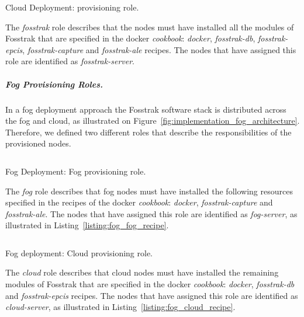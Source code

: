 \begin{listing}[ht!]
\inputminted[frame=lines,
             framesep=3mm,
             linenos=true,
             xleftmargin=21pt,
             tabsize=4]{json}{./listings/fosstrak_role.json}
\caption{Cloud Deployment: provisioning role.}
\label{listing:cloud_recipe}
\end{listing}

The \textit{fosstrak} role describes that the nodes must have installed all the modules of Fosstrak
that are specified in the docker \textit{cookbook}: \textit{docker}, \textit{fosstrak-db},
\textit{fosstrak-epcis}, \textit{fosstrak-capture} and \textit{fosstrak-ale} recipes. The nodes
that have assigned this role are identified as \textit{fosstrak-server}.

\subparagraph{Fog Provisioning Roles.}
\label{subp:fog_roles}
In a fog deployment approach the Fosstrak software stack is distributed across the fog and cloud,
as illustrated on Figure~\ref{fig:implementation_fog_architecture}. Therefore, we defined two different
roles that describe the responsibilities of the provisioned nodes.

\begin{listing}[ht!]
\inputminted[frame=lines,
             framesep=3mm,
             linenos=true,
             xleftmargin=21pt,
             tabsize=4]{json}{./listings/fog_role.json}
\caption{Fog Deployment: Fog provisioning role.}
\label{listing:fog_fog_recipe}
\end{listing}

The \textit{fog} role describes that fog nodes must have installed the following resources specified in the
recipes of the docker \textit{cookbook}: \textit{docker}, \textit{fosstrak-capture} and
\textit{fosstrak-ale}. The nodes that have assigned this role are identified as \textit{fog-server},
as illustrated in Listing~\ref{listing:fog_fog_recipe}.\\

\begin{listing}[ht!]
\inputminted[frame=lines,
             framesep=3mm,
             linenos=true,
             xleftmargin=21pt,
             tabsize=4]{json}{./listings/cloud_role.json}
\caption{Fog deployment: Cloud provisioning role.}
\label{listing:fog_cloud_recipe}
\end{listing}

The \textit{cloud} role describes that cloud nodes must have installed the remaining modules of Fosstrak
that are specified in the docker \textit{cookbook}: \textit{docker}, \textit{fosstrak-db} and
\textit{fosstrak-epcis} recipes. The nodes that have assigned this role are identified as
\textit{cloud-server}, as illustrated in Listing~\ref{listing:fog_cloud_recipe}.

